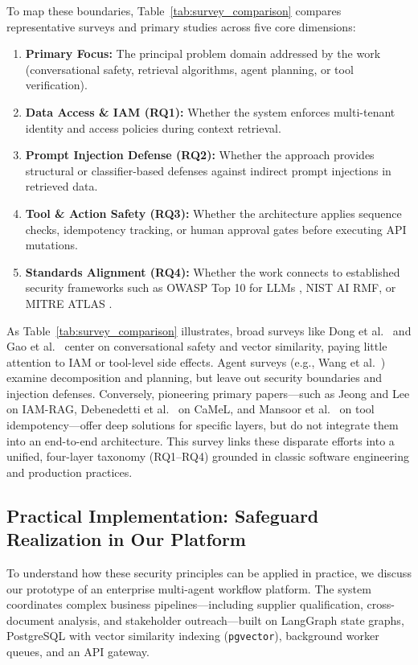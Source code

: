 \documentclass[sigconf]{acmart}
\begin{document}
To map these boundaries, Table~\ref{tab:survey_comparison} compares representative surveys and primary studies across five core dimensions:
\begin{enumerate}
  \item \textbf{Primary Focus:} The principal problem domain addressed by the work (conversational safety, retrieval algorithms, agent planning, or tool verification).
  \item \textbf{Data Access \& IAM (RQ1):} Whether the system enforces multi-tenant identity and access policies during context retrieval.
  \item \textbf{Prompt Injection Defense (RQ2):} Whether the approach provides structural or classifier-based defenses against indirect prompt injections in retrieved data.
  \item \textbf{Tool \& Action Safety (RQ3):} Whether the architecture applies sequence checks, idempotency tracking, or human approval gates before executing API mutations.
  \item \textbf{Standards Alignment (RQ4):} Whether the work connects to established security frameworks such as OWASP Top 10 for LLMs \cite{owasp2025llm}, NIST AI RMF, or MITRE ATLAS \cite{dev2025threat}.
\end{enumerate}

As Table~\ref{tab:survey_comparison} illustrates, broad surveys like Dong et al.~\cite{dong2025safeguardingsurvey} and Gao et al.~\cite{gao2023ragsurvey} center on conversational safety and vector similarity, paying little attention to IAM or tool-level side effects. Agent surveys (e.g., Wang et al.~\cite{wang2024agents}) examine decomposition and planning, but leave out security boundaries and injection defenses. Conversely, pioneering primary papers—such as Jeong and Lee \cite{jeonglee2025permissionawarerag} on IAM-RAG, Debenedetti et al.~\cite{debenedetti2026camel} on CaMeL, and Mansoor et al.~\cite{mansoor2026verifiedtoolcalls} on tool idempotency—offer deep solutions for specific layers, but do not integrate them into an end-to-end architecture. This survey links these disparate efforts into a unified, four-layer taxonomy (RQ1--RQ4) grounded in classic software engineering and production practices.

\subsection{Practical Implementation: Safeguard Realization in Our Platform}
\label{sec:implementation}
To understand how these security principles can be applied in practice, we discuss our prototype of an enterprise multi-agent workflow platform. The system coordinates complex business pipelines—including supplier qualification, cross-document analysis, and stakeholder outreach—built on LangGraph state graphs, PostgreSQL with vector similarity indexing (\texttt{pgvector}), background worker queues, and an API gateway.
\end{document}
